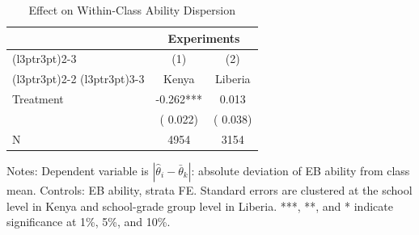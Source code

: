\begin{table}[!h]
\centering
\caption{Effect on Within-Class Ability Dispersion}
\label{tab:dispersion}
\begin{threeparttable}
\begin{tabular}[t]{lcc}
\toprule
\multicolumn{1}{c}{ } & \multicolumn{2}{c}{Experiments} \\
\cmidrule(l{3pt}r{3pt}){2-3}
\multicolumn{1}{c}{ } & \multicolumn{1}{c}{(1)} & \multicolumn{1}{c}{(2)} \\
\cmidrule(l{3pt}r{3pt}){2-2} \cmidrule(l{3pt}r{3pt}){3-3}
 & \multicolumn{1}{c}{Kenya} & \multicolumn{1}{c}{Liberia} \\
\midrule
Treatment &  -0.262*** &   0.013 \\
 & (  0.022) & (  0.038) \\
\addlinespace
N & 4954 & 3154 \\
\bottomrule
\end{tabular}
\begin{tablenotes}[para]
\item Notes: Dependent variable is $|\hat{\theta}_i - \bar{\theta}_k|$: absolute deviation of EB ability from class mean. Controls: EB ability, strata FE. Standard errors are clustered at the school level in Kenya and school-grade group level in Liberia. ***, **, and * indicate significance at 1\%, 5\%, and 10\%.
\end{tablenotes}
\end{threeparttable}
\end{table}

